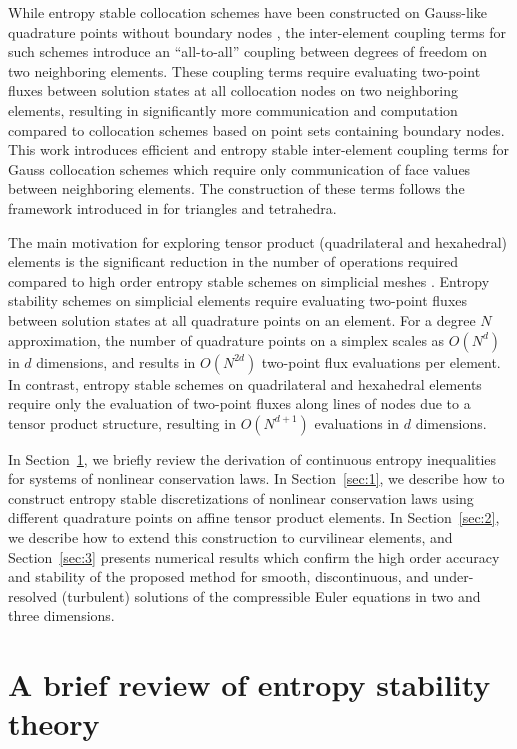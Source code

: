 \documentclass[review,onefignum,onetabnum,final]{siamart171218}
\begin{document}
While entropy stable collocation schemes have been constructed on Gauss-like quadrature points without boundary nodes \cite{crean2017high}, the inter-element coupling terms for such schemes introduce an ``all-to-all'' coupling between degrees of freedom on two neighboring elements.  These coupling terms require evaluating two-point fluxes between solution states at all collocation nodes on two neighboring elements, resulting in significantly more communication and computation compared to collocation schemes based on point sets containing boundary nodes.  This work introduces efficient and entropy stable inter-element coupling terms for Gauss collocation schemes which require only communication of face values between neighboring elements.  The construction of these terms follows the framework introduced in \cite{chan2017discretely, chan2018discretely} for triangles and tetrahedra.  

The main motivation for exploring tensor product (quadrilateral and hexahedral) elements is the significant reduction in the number of operations required compared to high order entropy stable schemes on simplicial meshes \cite{chan2017discretely, chan2018discretely}.  Entropy stability schemes on simplicial elements require evaluating two-point fluxes between solution states at all quadrature points on an element.  For a degree $N$ approximation, the number of quadrature points on a simplex scales as $O(N^d)$ in $d$ dimensions, and results in $O(N^{2d})$ two-point flux evaluations per element.  In contrast, entropy stable schemes on quadrilateral and hexahedral elements require only the evaluation of two-point fluxes along lines of nodes due to a tensor product structure, resulting in $O(N^{d+1})$ evaluations in $d$ dimensions.  

In Section~\ref{sec:0}, we briefly review the derivation of continuous entropy inequalities for systems of nonlinear conservation laws.  In Section~\ref{sec:1}, we describe how to construct entropy stable discretizations of nonlinear conservation laws using different quadrature points on affine tensor product elements.  In Section~\ref{sec:2}, we describe how to extend this construction to curvilinear elements, and Section~\ref{sec:3} presents numerical results which confirm the high order accuracy and stability of the proposed method for smooth, discontinuous, and under-resolved (turbulent) solutions of the compressible Euler equations in two and three dimensions.  

\section{A brief review of entropy stability theory}
\label{sec:0}
\end{document}
